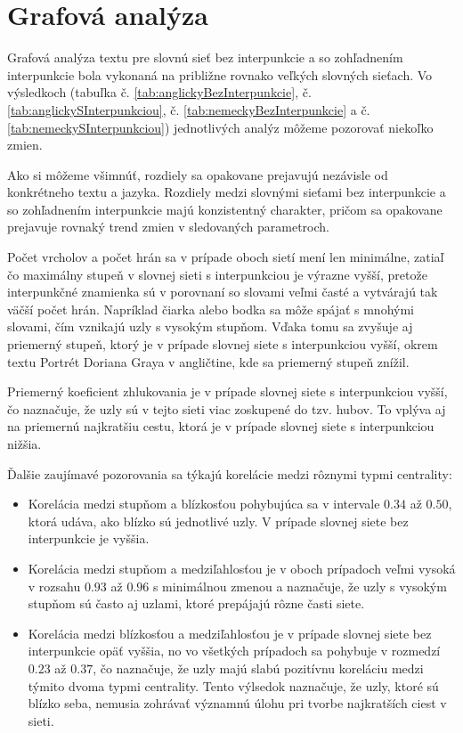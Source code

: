 \clearpage

\section{Grafová analýza}\label{sec:grafovaAnalyza}

Grafová analýza textu pre slovnú sieť bez interpunkcie a so zohľadnením interpunkcie bola vykonaná na približne rovnako veľkých slovných sieťach.
Vo výsledkoch (tabuľka č. \ref{tab:anglickyBezInterpunkcie}, č. \ref{tab:anglickySInterpunkciou}, č. \ref{tab:nemeckyBezInterpunkcie} a č. \ref{tab:nemeckySInterpunkciou})
jednotlivých analýz môžeme pozorovať niekoľko zmien.

Ako si môžeme všimnúť, rozdiely sa opakovane prejavujú nezávisle od konkrétneho textu a jazyka. Rozdiely medzi slovnými sieťami bez interpunkcie a so zohľadnením interpunkcie
majú konzistentný charakter, pričom sa opakovane prejavuje rovnaký trend zmien v sledovaných parametroch.

Počet vrcholov a počet hrán sa v prípade oboch sietí mení len minimálne, zatiaľ čo maximálny stupeň v slovnej sieti s interpunkciou je výrazne vyšší, pretože
interpunkčné znamienka sú v porovnaní so slovami veľmi časté a vytvárajú tak väčší počet hrán. Napríklad čiarka alebo bodka sa môže spájať s mnohými slovami, čím vznikajú
uzly s vysokým stupňom. Vďaka tomu sa zvyšuje aj priemerný stupeň, ktorý je v prípade slovnej siete s interpunkciou vyšší, okrem textu Portrét Doriana Graya v angličtine, kde sa
priemerný stupeň znížil. 

Priemerný koeficient zhlukovania je v prípade slovnej siete s interpunkciou vyšší, čo naznačuje, že uzly sú v tejto sieti viac zoskupené do tzv. hubov. To vplýva aj na 
priemernú najkratšiu cestu, ktorá je v prípade slovnej siete s interpunkciou nižšia.

Ďalšie zaujímavé pozorovania sa týkajú korelácie medzi rôznymi typmi centrality:
\begin{itemize}
    \item Korelácia medzi stupňom a blízkosťou pohybujúca sa v intervale $0.34$ až $0.50$, ktorá udáva, ako blízko sú jednotlivé uzly.
          V prípade slovnej siete bez interpunkcie je vyššia.
    \item Korelácia medzi stupňom a medziľahlosťou je v oboch prípadoch veľmi vysoká v rozsahu $0.93$ až $0.96$ s minimálnou zmenou a naznačuje, že uzly s vysokým stupňom
          sú často aj uzlami, ktoré prepájajú rôzne časti siete.
    \item Korelácia medzi blízkosťou a medziľahlosťou je v prípade slovnej siete bez interpunkcie opäť vyššia, no vo všetkých prípadoch sa
          pohybuje v rozmedzí $0.23$ až $0.37$, čo naznačuje, že uzly majú slabú pozitívnu koreláciu medzi týmito dvoma typmi centrality. Tento výlsedok naznačuje, že uzly, ktoré sú blízko seba,
          nemusia zohrávať významnú úlohu pri tvorbe najkratších ciest v sieti.
\end{itemize}

